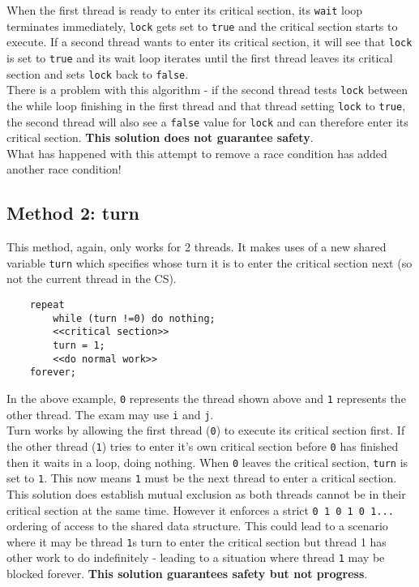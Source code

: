 When the first thread is ready to enter its critical section, its \verb|wait| loop terminates immediately, \verb|lock| gets set to \verb|true| and the critical section starts to execute. If a second thread wants to enter its critical section, it will see that \verb|lock| is set to \verb|true| and its wait loop iterates until the first thread leaves its critical section and sets \verb|lock| back to \verb|false|.\\

There is a problem with this algorithm - if the second thread tests \verb|lock| between the while loop finishing in the first thread and that thread setting \verb|lock| to \verb|true|, the second thread will also see a \verb|false| value for \verb|lock| and can therefore enter its critical section. \textbf{This solution does not guarantee safety}.\\

What has happened with this attempt to remove a race condition has added another race condition!

\subsection{Method 2: turn}
This method, again, only works for 2 threads. It makes uses of a new shared variable \verb|turn| which specifies whose turn it is to enter the critical section next (so not the current thread in the CS).
\begin{verbatim}
    repeat
        while (turn !=0) do nothing;
        <<critical section>>
        turn = 1;
        <<do normal work>>
    forever;
\end{verbatim}
In the above example, \verb|0| represents the thread shown above and \verb|1| represents the other thread. The exam may use \verb|i| and \verb|j|.\\

Turn works by allowing the first thread (\verb|0|) to execute its critical section first. If the other thread (\verb|1|) tries to enter it's own critical section before \verb|0| has finished then it waits in a loop, doing nothing. When \verb|0| leaves the critical section, \verb|turn| is set to \verb|1|. This now means \verb|1| must be the next thread to enter a critical section.\\

This solution does establish mutual exclusion as both threads cannot be in their critical section at the same time. However it enforces a strict \verb|0 1 0 1 0 1...| ordering of access to the shared data structure. This could lead to a scenario where it may be thread \verb|1|s turn to enter the critical section but thread 1 has other work to do indefinitely - leading to a situation where thread \verb|1| may be blocked forever. \textbf{This solution guarantees safety but not progress}. 

